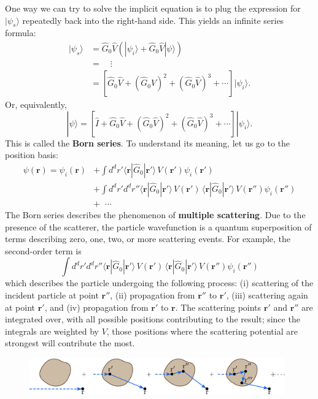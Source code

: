 \documentclass[pra,12pt]{revtex4}
\begin{document}
One way we can try to solve the implicit equation is to plug the
expression for $|\psi_s\rangle$ repeatedly back into the right-hand
side.  This yields an infinite series formula:
$$\begin{aligned}|\psi_s\rangle &= \hat{G}_0 \hat{V} \left(|\psi_i\rangle + \hat{G}_0 \hat{V}|\psi\rangle\right) \\ &= \quad \vdots \\ &= \left[\hat{G}_0 \hat{V} + (\hat{G}_0 \hat{V})^2 + (\hat{G}_0 \hat{V})^3 + \cdots\right]|\psi_i\rangle.\end{aligned}$$
Or, equivalently,
$$|\psi\rangle = \left[\hat{I} + \hat{G}_0 \hat{V} + (\hat{G}_0 \hat{V})^2 + (\hat{G}_0 \hat{V})^3 + \cdots\right]|\psi_i\rangle.$$
This is called the \textbf{Born series}.  To understand its meaning,
let us go to the position basis:
$$\begin{aligned}\psi(\mathbf{r}) = \psi_i(\mathbf{r}) &+ \int d^dr' \langle \mathbf{r} | \hat{G}_0 |\mathbf{r}'\rangle\, V(\mathbf{r}') \psi_i(\mathbf{r}') \\ &+ \int d^dr' d^dr'' \langle \mathbf{r} | \hat{G}_0 |\mathbf{r}'\rangle\, V(\mathbf{r}') \, \langle \mathbf{r} | \hat{G}_0 |\mathbf{r}'\rangle \, V(\mathbf{r}'') \psi_i(\mathbf{r}'') \\ &+ \;\;\cdots\end{aligned}$$
The Born series describes the phenomenon of \textbf{multiple
  scattering}.  Due to the presence of the scatterer, the particle
wavefunction is a quantum superposition of terms describing zero, one,
two, or more scattering events.  For example, the second-order term is
$$\int d^dr' d^dr'' \langle \mathbf{r} | \hat{G}_0 |\mathbf{r}'\rangle\, V(\mathbf{r}') \, \langle \mathbf{r} | \hat{G}_0 |\mathbf{r}'\rangle \, V(\mathbf{r}'') \psi_i(\mathbf{r}'')$$
which describes the particle undergoing the following process: (i)
scattering of the incident particle at point $\mathbf{r}''$, (ii)
propagation from $\mathbf{r}''$ to $\mathbf{r}'$, (iii) scattering
again at point $\mathbf{r}'$, and (iv) propagation from $\mathbf{r}'$
to $\mathbf{r}$.  The scattering points $\mathbf{r}'$ and
$\mathbf{r}''$ are integrated over, with all possible positions
contributing to the result; since the integrals are weighted by $V$,
those positions where the scattering potential are strongest will
contribute the most.

\begin{figure}[h!]
  \centering\includegraphics[width=0.98\textwidth]{bornseries}
\end{figure}
\end{document}
